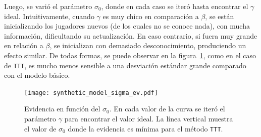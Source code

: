 \documentclass[11pt,twoside,spanish]{report} %
\begin{document}
\begin{table}[H]
\centering
{}
\caption{Tabla de valores para los par\'ametros del modelo para el caso de tres habilidades iniciales diferentes. En estos casos, $\beta$ es 1, el $\sigma_0$ inicial es 3 y el $\gamma$ $1e-07$.}
\label{tab:mu}
\end{table}


Luego, se vari\'o el par\'ametro $\sigma_0$, donde en cada caso se iter\'o hasta encontrar el $\gamma$ ideal.
Intuitivamente, cuando $\gamma$ es muy chico en comparaci\'on a $\beta$, se est\'an inicializando los jugadores nuevos (de los cuales no se conoce nada), con mucha informaci\'on, dificultando su actualizaci\'on.
En caso contrario, si fuera muy grande en relaci\'on a $\beta$, se inicializan con demasiado desconocimiento, produciendo un efecto similar.
De todas formas, se puede observar en la figura~\ref{fig:sigma_ev}, como en el caso de \texttt{TTT}, es mucho menos sensible a una desviaci\'on est\'andar grande comparado con el modelo b\'asico.

\begin{figure}[H]
	\centering
	\texttt{[image: synthetic\_model\_sigma\_ev.pdf]}
	\caption{Evidencia en funci\'on del  $\sigma_0$. En cada valor de la curva se iter\'o el par\'ametro $\gamma$ para encontrar el valor ideal. La l\'inea vertical muestra el valor de $\sigma_0$ donde la evidencia es m\'inima para el m\'etodo \texttt{TTT}.}
	\label{fig:sigma_ev}
\end{figure}
\end{document}
